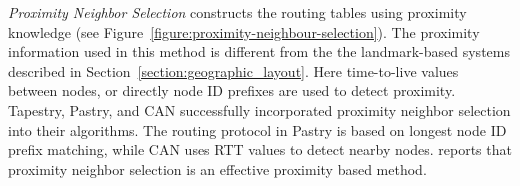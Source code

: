 \emph{Proximity Neighbor Selection} constructs the routing tables using
proximity knowledge (see Figure~\ref{figure:proximity-neighbour-selection}). The
proximity information used in this method is different from the the
landmark-based systems described in Section~\ref{section:geographic_layout}.
Here time-to-live values between nodes, or directly node ID prefixes are used to
detect proximity. Tapestry, Pastry, and CAN successfully incorporated 
proximity neighbor selection into their algorithms. The routing protocol in
Pastry is based on longest node ID prefix matching, while CAN uses RTT values to
detect nearby nodes. \cite{CDCR2002a} reports that proximity neighbor
selection is an effective proximity based method.


%
%
%
%
%
